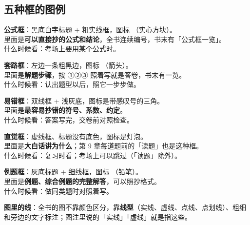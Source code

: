 \subsection*{五种框的图例}
{\small
\begin{tcbraster}[raster columns=2,raster equal height=rows,raster column skip=4mm,raster row skip=3mm]
\begin{tcolorbox}[fmlstyle,unbreakable,title={\icoF\ 【公式 F$n$】标题}]
\textbf{公式框}：黑底白字标题 + 粗实线框，图标 （实心方块）。\\
里面是\textbf{可以直接抄的公式和结论}，全书连续编号，书末有「公式框一览」。\\
\textsf{什么时候看}：考场上要用某个公式时。
\end{tcolorbox}
\begin{tcolorbox}[rcpstyle,unbreakable,title={\icoR\ 【套路 $n$】标题}]
\textbf{套路框}：左边一条粗黑边，图标 （箭头）。\\
里面是\textbf{解题步骤}，按 ①②③ 照着写就是答卷，书末有一览。\\
\textsf{什么时候看}：认出题型以后，照它一步步做。
\end{tcolorbox}
\begin{tcolorbox}[warnstyle,unbreakable,title={\icoW\ 【易错】标题}]
\textbf{易错框}：双线框 + 浅灰底，图标是带感叹号的三角。\\
里面是\textbf{最容易抄错的符号、系数、约定}。\\
\textsf{什么时候看}：答案写完，交卷前对照检查。
\end{tcolorbox}
\begin{tcolorbox}[ideastyle,unbreakable,title={\icoI\ 【直觉】标题}]
\textbf{直觉框}：虚线框、标题没有底色，图标是灯泡。\\
里面是\textbf{大白话讲为什么}；第 9 章每道题前的「读题」也是这种框。\\
\textsf{什么时候看}：复习时看；考场上可以跳过（「读题」除外）。
\end{tcolorbox}
\begin{tcolorbox}[examstyle,unbreakable,title={\icoE\ 【例】标题}]
\textbf{例题框}：灰底标题 + 细线框，图标 （铅笔）。\\
里面是\textbf{例题、综合例题的完整解答}，可以照抄格式。\\
\textsf{什么时候看}：做同类题时对照着写。
\end{tcolorbox}
\begin{tcolorbox}[enhanced,colback=white,frame hidden,unbreakable,left=2pt]
\textbf{图里的线}：全书的图不靠颜色区分，靠\textbf{线型}（实线、虚线、点线、点划线）、粗细和旁边的文字标注；图注里说的「实线」「虚线」就是指这些。
\end{tcolorbox}
\end{tcbraster}}

